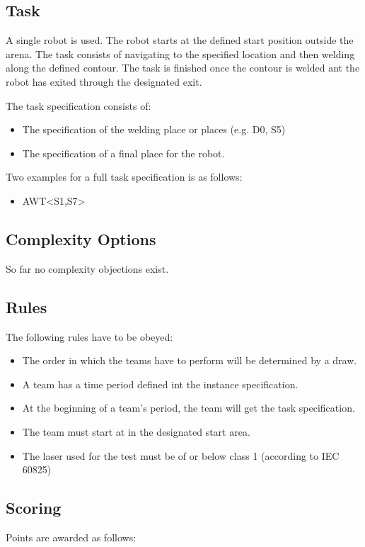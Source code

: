 \subsection{Task}
A single robot is used. The robot starts at the defined start position outside the arena. The task consists of navigating to the specified location and then welding along the defined contour. The task is finished once the contour is welded ant the robot has exited through the designated exit.
\par
The task specification consists of: 
\begin{itemize}
	\item The specification of the welding place or places (e.g. D0, S5)
	\item The specification of a final place for the robot.
\end{itemize}

Two examples for a full task specification is as follows:
\begin{itemize}
	\item AWT\textless S1,S7\textgreater 
\end{itemize}


\subsection{Complexity Options}

So far no complexity objections exist.

\subsection{Rules}
The following rules have to be obeyed:

\begin{itemize}
\item The order in which the teams have to perform will be determined by a draw.
\item A team has a time period defined int the instance specification.
\item At the beginning of a team's period, the team will get the task specification. 
\item The team must start at in the designated start area.
\item The laser used for the test must be of or below class 1 (according to IEC 60825)
\end{itemize}


\subsection{Scoring}
Points are awarded as follows:

